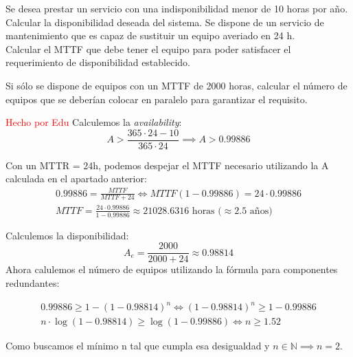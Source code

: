 \begin{problem}[2]
Se desea prestar un servicio con una indisponibilidad menor de 10 horas por año.
  \ppart Calcular la disponibilidad deseada del sistema.
  \ppart Se dispone de un servicio de mantenimiento que es capaz de sustituir un equipo averiado en 24 h.\\
Calcular el MTTF que debe tener el equipo para poder satisfacer el requerimiento de disponibilidad establecido.

  \ppart Si sólo se dispone de equipos con un MTTF de 2000 horas, calcular el número de equipos que se deberían colocar en paralelo para garantizar el requisito.

\solution
\textcolor{red}{Hecho por Edu}
\spart
  Calculemos la \textit{availability}:
  \[ A > \frac{365\cdot24-10}{365\cdot24} \implies A > 0.99886 \]

\spart
	Con un MTTR = 24h, podemos despejar el MTTF necesario utilizando la A calculada en el apartado anterior:
	\begin{gather*}
	0.99886 = \frac{\textit{MTTF}}{\textit{MTTF}+24} \iff \textit{MTTF}(1-0.99886)=24\cdot0.99886\\
	\textit{MTTF} = \frac{24\cdot0.99886}{1-0.99886} \approx 21028.6316 \text{ horas (} \approx\text{2.5 años)}
	\end{gather*}

\spart
	Calculemos la disponibilidad:
	\[ A_e = \frac{2000}{2000+24} \approx 0.98814 \]
	Ahora calulemos el número de equipos utilizando la fórmula para componentes redundantes:

	\begin{gather*}
	0.99886 \geq 1 - (1 - 0.98814)^n \iff (1 - 0.98814)^n \geq 1 - 0.99886\\
	n\cdot \log(1 - 0.98814) \geq  \log(1 - 0.99886) \iff n \geq 1.52
	\end{gather*}

	Como buscamos el mínimo n tal que cumpla esa desigualdad y $n \in \mathbb{N} \implies n = 2$.

\end{problem}

